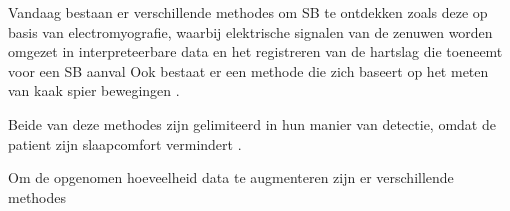 \documentclass{hogent-article}
\begin{document}
Vandaag bestaan er verschillende methodes om SB te ontdekken zoals deze op basis van electromyografie, waarbij elektrische signalen van de zenuwen worden omgezet in interpreteerbare data en het registreren van de hartslag die toeneemt voor een SB aanval \cite{Deregibus_2013}
Ook bestaat er een methode die zich baseert op het meten van kaak spier bewegingen .

Beide van deze methodes zijn gelimiteerd in hun manier van detectie, omdat de patient zijn slaapcomfort vermindert .

Om de opgenomen hoeveelheid data te augmenteren zijn er verschillende methodes 
\end{document}
